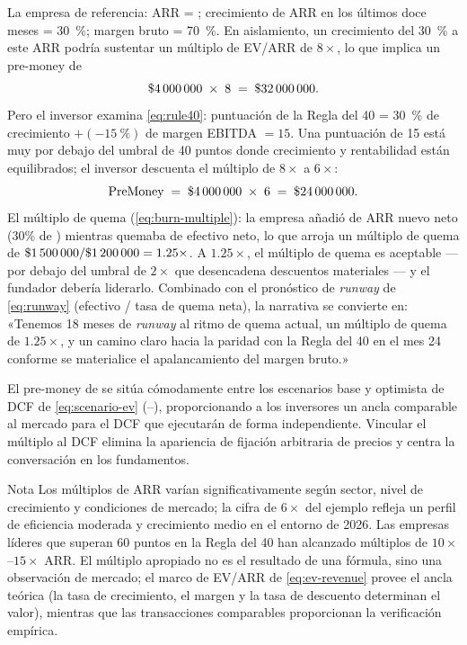 \begin{example}
La empresa de referencia: ARR = ; crecimiento de ARR en los últimos doce
meses = \qty{30}{\percent}; margen bruto = \qty{70}{\percent}. En aislamiento, un
crecimiento del \qty{30}{\percent} a este ARR podría sustentar un múltiplo de EV/ARR de
\(8\times\), lo que implica un pre-money de
\[
  \$\num{4000000} \;\times\; 8 \;=\; \$\num{32000000}.
\]
Pero el inversor examina \cref{eq:rule40}: puntuación de la Regla del 40 =
\qty{30}{\percent} de crecimiento $+ (-\qty{15}{\percent})$ de margen EBITDA $= 15$. Una
puntuación de 15 está muy por debajo del umbral de 40 puntos donde crecimiento y
rentabilidad están equilibrados; el inversor descuenta el múltiplo de $8\times$ a $6\times$:
\[
  \mathrm{PreMoney} \;=\; \$\num{4000000} \;\times\; 6 \;=\; \$\num{24000000}.
\]
El múltiplo de quema (\cref{eq:burn-multiple}): la empresa añadió  de ARR
nuevo neto (30\% de ) mientras quemaba  de efectivo neto, lo
que arroja un múltiplo de quema de \(\$\num{1500000}/\$\num{1200000} = 1.25\times\). A
$1.25\times$, el múltiplo de quema es aceptable --- por debajo del umbral de $2\times$ que
desencadena descuentos materiales --- y el fundador debería liderarlo. Combinado con el
pronóstico de \emph{runway} de \cref{eq:runway} (efectivo / tasa de quema neta), la
narrativa se convierte en: «Tenemos 18 meses de \emph{runway} al ritmo de quema actual, un
múltiplo de quema de $1.25\times$, y un camino claro hacia la paridad con la Regla del 40
en el mes 24 conforme se materialice el apalancamiento del margen bruto.»

El pre-money de  se sitúa cómodamente entre los escenarios base y optimista
de DCF de \cref{eq:scenario-ev} (--), proporcionando a los
inversores un ancla comparable al mercado para el DCF que ejecutarán de forma independiente.
Vincular el múltiplo al DCF elimina la apariencia de fijación arbitraria de precios y
centra la conversación en los fundamentos.
\end{example}

\begin{admonition}{Nota}
Los múltiplos de ARR varían significativamente según sector, nivel de crecimiento y
condiciones de mercado; la cifra de $6\times$ del ejemplo refleja un perfil de eficiencia
moderada y crecimiento medio en el entorno de 2026. Las empresas líderes que superan 60
puntos en la Regla del 40 han alcanzado múltiplos de \(10\times\)--\(15\times\) ARR. El
múltiplo apropiado no es el resultado de una fórmula, sino una observación de mercado; el
marco de EV/ARR de \cref{eq:ev-revenue} provee el ancla teórica (la tasa de crecimiento, el
margen y la tasa de descuento determinan el valor), mientras que las transacciones
comparables proporcionan la verificación empírica.
\end{admonition}


